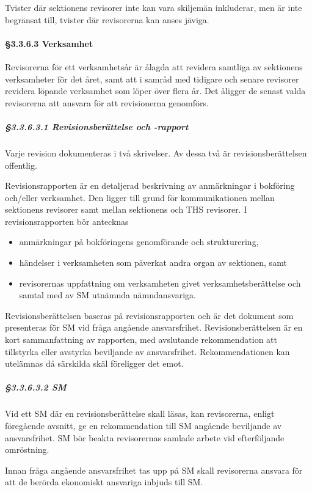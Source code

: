 Tvister där sektionens revisorer inte kan vara skiljemän inkluderar, men är inte begränsat till, tvister där revisorerna kan anses jäviga.

\paragraph{§3.3.6.3 Verksamhet}

Revisorerna för ett verksamhetsår är ålagda att revidera samtliga av sektionens verksamheter för det året, samt att i samråd med tidigare och senare revisorer revidera löpande verksamhet som löper över flera år. Det åligger de senast valda revisorerna att ansvara för att revisionerna genomförs.

\subparagraph{§3.3.6.3.1 Revisionsberättelse och -rapport}

Varje revision dokumenteras i två skrivelser. Av dessa två är revisionsberättelsen offentlig.

Revisionsrapporten är en detaljerad beskrivning av anmärkningar i bokföring och/eller verksamhet. Den ligger till grund för kommunikationen mellan sektionens revisorer samt mellan sektionens och THS revisorer. I revisionsrapporten bör antecknas

\begin{itemize}
  \item anmärkningar på bokföringens genomförande och strukturering,
  \item händelser i verksamheten som påverkat andra organ av sektionen, samt
  \item revisorernas uppfattning om verksamheten givet verksamhetsberättelse och samtal med av SM utnämnda nämndansvariga.
\end{itemize}

Revisionsberättelsen baseras på revisionsrapporten och är det dokument som presenteras för SM vid fråga angående ansvarsfrihet. Revisionsberättelsen är en kort sammanfattning av rapporten, med avslutande rekommendation att tillstyrka eller avstyrka beviljande av ansvarsfrihet. Rekommendationen kan utelämnas då särskilda skäl föreligger det emot.

\subparagraph{§3.3.6.3.2 SM}

Vid ett SM där en revisionsberättelse skall läsas, kan revisorerna, enligt föregående avsnitt, ge en rekommendation till SM angående beviljande av ansvarsfrihet. SM bör beakta revisorernas samlade arbete vid efterföljande omröstning.

Innan fråga angående ansvarsfrihet tas upp på SM skall revisorerna ansvara för att de berörda ekonomiskt ansvariga inbjuds till SM.

